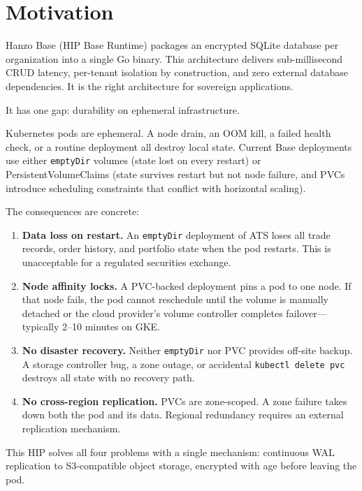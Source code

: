 \section{Motivation}


Hanzo Base (HIP Base Runtime) packages an encrypted SQLite database per
organization into a single Go binary. This architecture delivers
sub-millisecond CRUD latency, per-tenant isolation by construction, and zero
external database dependencies. It is the right architecture for sovereign
applications.

It has one gap: durability on ephemeral infrastructure.

Kubernetes pods are ephemeral. A node drain, an OOM kill, a failed health
check, or a routine deployment all destroy local state. Current Base
deployments use either \texttt{emptyDir} volumes (state lost on every
restart) or PersistentVolumeClaims (state survives restart but not node
failure, and PVCs introduce scheduling constraints that conflict with
horizontal scaling).

The consequences are concrete:

\begin{enumerate}[nosep]
    \item \textbf{Data loss on restart.} An \texttt{emptyDir} deployment of
    ATS loses all trade records, order history, and portfolio state when the
    pod restarts. This is unacceptable for a regulated securities exchange.

    \item \textbf{Node affinity locks.} A PVC-backed deployment pins a pod to
    one node. If that node fails, the pod cannot reschedule until the volume
    is manually detached or the cloud provider's volume controller completes
    failover---typically 2--10 minutes on GKE.

    \item \textbf{No disaster recovery.} Neither \texttt{emptyDir} nor PVC
    provides off-site backup. A storage controller bug, a zone outage, or
    accidental \texttt{kubectl delete pvc} destroys all state with no
    recovery path.

    \item \textbf{No cross-region replication.} PVCs are zone-scoped. A zone
    failure takes down both the pod and its data. Regional redundancy requires
    an external replication mechanism.
\end{enumerate}

This HIP solves all four problems with a single mechanism: continuous WAL
replication to S3-compatible object storage, encrypted with age before
leaving the pod.

